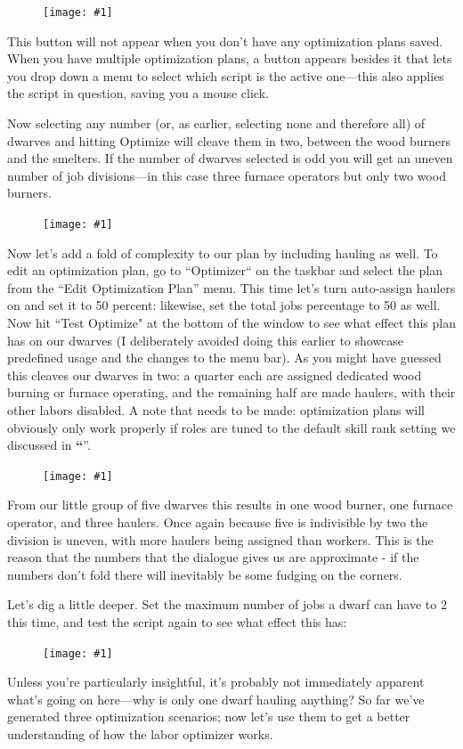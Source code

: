 \documentclass[]{article}
\newcommand{\jump}[1] {\textbf{``\nameref{sec:#1}}''}
\newcommand{\fullfigure}[1] {
\begin{figure}[h!]
\texttt{[image: \#1]}
\end{figure}
}
\begin{document}
\fullfigure{Sec4Fig8}

This button will not appear when you don't have any optimization plans saved. When you have multiple
optimization plans, a button appears besides it that lets you drop down a menu to select which script is
the active one---this also applies the script in question, saving you a mouse click.

Now selecting any number (or, as earlier, selecting none and therefore all) of dwarves and
hitting Optimize will cleave them in two, between the wood burners and the smelters. If the number of
dwarves selected is odd you will get an uneven number of job divisions---in this case three furnace
operators but only two wood burners.

\fullfigure{Sec4Fig10}

Now let's add a fold of complexity to our plan by including hauling as well. To edit an optimization
plan, go to ``Optimizer`` on the taskbar and select the plan from the ``Edit Optimization Plan'' menu. This
time let's turn auto-assign haulers on and set it to 50 percent: likewise, set the total jobs percentage
to 50 as well. Now hit ``Test Optimize" at the bottom of the window to see what effect this plan has on
our dwarves (I deliberately avoided doing this earlier to showcase predefined usage and the changes to
the menu bar). As you might have guessed this cleaves our dwarves in two: a quarter each are assigned
dedicated wood burning or furnace operating, and the remaining half are made haulers, with their other
labors disabled. A note that needs to be made: optimization plans will obviously only work properly if
roles are tuned to the default skill rank setting we discussed in \jump{Roles}.

\fullfigure{Sec4Fig11}

From our little group of five dwarves this results in one wood burner, one furnace operator, and three
haulers. Once again because five is indivisible by two the division is uneven, with more haulers being
assigned than workers.  This is the reason that the numbers that the dialogue gives us are approximate -
if the numbers don't fold there will inevitably be some fudging on the corners.

Let's dig a little deeper. Set the maximum number of jobs a dwarf can have to 2 this time, and test the
script again to see what effect this has:
\fullfigure{Sec4Fig12}

Unless you're particularly insightful, it's probably not immediately apparent what's going on here---why
is only one dwarf hauling anything? So far we've generated three optimization scenarios; now let's use
them to get a better understanding of how the labor optimizer works.
\end{document}

